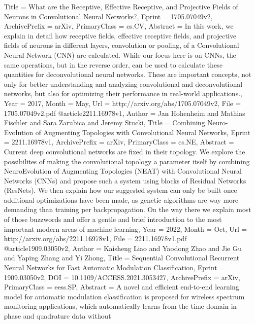 {{{{Title         = {What are the Receptive, Effective Receptive, and Projective Fields of
  Neurons in Convolutional Neural Networks?},
Eprint        = {1705.07049v2},
ArchivePrefix = {arXiv},
PrimaryClass  = {cs.CV},
Abstract      = {In this work, we explain in detail how receptive fields, effective receptive
fields, and projective fields of neurons in different layers, convolution or
pooling, of a Convolutional Neural Network (CNN) are calculated. While our
focus here is on CNNs, the same operations, but in the reverse order, can be
used to calculate these quantities for deconvolutional neural networks. These
are important concepts, not only for better understanding and analyzing
convolutional and deconvolutional networks, but also for optimizing their
performance in real-world applications.},
Year          = {2017},
Month         = {May},
Url           = {http://arxiv.org/abs/1705.07049v2},
File          = {1705.07049v2.pdf}
}
@article{2211.16978v1,
Author        = {Jan Hohenheim and Mathias Fischler and Sara Zarubica and Jeremy Stucki},
Title         = {Combining Neuro-Evolution of Augmenting Topologies with Convolutional
  Neural Networks},
Eprint        = {2211.16978v1},
ArchivePrefix = {arXiv},
PrimaryClass  = {cs.NE},
Abstract      = {Current deep convolutional networks are fixed in their topology. We explore
the possibilites of making the convolutional topology a parameter itself by
combining NeuroEvolution of Augmenting Topologies (NEAT) with Convolutional
Neural Networks (CNNs) and propose such a system using blocks of Residual
Networks (ResNets). We then explain how our suggested system can only be built
once additional optimizations have been made, as genetic algorithms are way
more demanding than training per backpropagation. On the way there we explain
most of those buzzwords and offer a gentle and brief introduction to the most
important modern areas of machine learning},
Year          = {2022},
Month         = {Oct},
Url           = {http://arxiv.org/abs/2211.16978v1},
File          = {2211.16978v1.pdf}
}
@article{1909.03050v2,
Author        = {Kaisheng Liao and Yaodong Zhao and Jie Gu and Yaping Zhang and Yi Zhong},
Title         = {Sequential Convolutional Recurrent Neural Networks for Fast Automatic
  Modulation Classification},
Eprint        = {1909.03050v2},
DOI           = {10.1109/ACCESS.2021.3053427},
ArchivePrefix = {arXiv},
PrimaryClass  = {eess.SP},
Abstract      = {A novel and efficient end-to-end learning model for automatic modulation
classification is proposed for wireless spectrum monitoring applications, which
automatically learns from the time domain in-phase and quadrature data without
}}}}}
